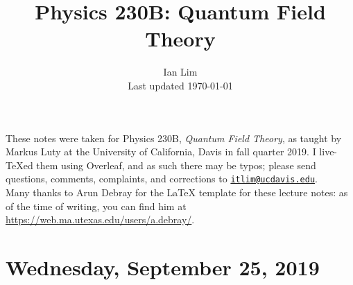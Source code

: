 \documentclass{../mynotes}
\begin{document}
\title{Physics 230B: Quantum Field Theory}
\author{Ian Lim\\ Last updated \today}
\maketitle
{\small\noindent These notes were taken for Physics 230B, \emph{Quantum Field Theory}, as taught by Markus Luty at the University of California, Davis in fall quarter 2019. I live-\TeX ed them using Overleaf, and as such there may be typos; please send questions, comments, complaints, and corrections to 
\href{mailto:itlim@ucdavis.edu?subject=230B\%20Lecture\%20Notes}{\texttt{itlim@ucdavis.edu}}.\\
Many thanks to Arun Debray for the {\LaTeX} template for these lecture notes: as of the time of writing, you can find him at \url{https://web.ma.utexas.edu/users/a.debray/}.}

\tableofcontents

\section{Wednesday, September 25, 2019}
	
\end{document}
